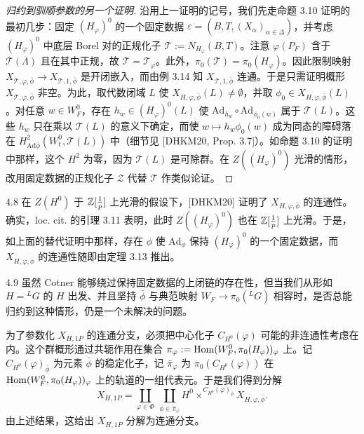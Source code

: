 \begin{proof}[归约到驯顺参数的另一个证明]
沿用上一证明的记号，我们先走命题 3.10 证明的最初几步：固定 $(H_\varphi)^0$ 的一个固定数据 $\varepsilon=(B,T,(X_\alpha)_{\alpha\in\Delta})$，并考虑 $(H_\varphi)^0$ 中底层 Borel 对的正规化子 $\mathcal T:=N_{H_\varphi}(B,T)$。注意 $\varphi(P_F)$ 含于 $\mathcal T(\Lambda)$ 且在其中正规，故 $\mathcal T=\mathcal T_\varphi$。此外，$\pi_0(\mathcal T)=\pi_0(H_\varphi)$。因此限制映射 $X_{\mathcal T,\varphi,\bar\phi}\to X_{\mathcal T,1,\bar\phi}$ 是开闭嵌入，而由例 3.14 知 $X_{\mathcal T,1,\bar\phi}$ 连通。于是只需证明概形 $X_{\mathcal T,\varphi,\bar\phi}$ 非空。为此，取代数闭域 $L$ 使 $X_{H,\varphi,\bar\phi}(L)\neq\emptyset$，并取 $\phi_0\in X_{H,\varphi,\bar\phi}(L)$。对任意 $w\in W^0_F$，存在 $h_w\in(H_\varphi)^0(L)$ 使 $\mathrm{Ad}_{h_w}\circ\mathrm{Ad}_{\phi_0(w)}$ 属于 $\mathcal T(L)$。这些 $h_w$ 只在乘以 $\mathcal T(L)$ 的意义下确定，而使 $w\mapsto h_w\phi_0(w)$ 成为同态的障碍落在 $H^2_{\mathrm{Ad}\bar\phi}(W^0_t,\mathcal T(L))$ 中（细节见 [DHKM20, Prop. 3.7]）。如命题 3.10 的证明中那样，这个 $H^2$ 为零，因为 $\mathcal T(L)$ 是可除群。在 $Z((H_\varphi)^0)$ 光滑的情形，改用固定数据的正规化子 $\mathcal Z$ 代替 $\mathcal T$ 作类似论证。
\end{proof}

\begin{rem}{4.8}
在 $Z(H^0)$ 于 $\mathbb{Z}[\frac1p]$ 上光滑的假设下，[DHKM20] 证明了 $X_{H,\varphi,\bar\phi}$ 的连通性。确实，loc. cit. 的引理 3.11 表明，此时 $Z((H_\varphi)^0)$ 也在 $\mathbb{Z}[\frac1p]$ 上光滑。于是，如上面的替代证明中那样，存在 $\phi$ 使 $\mathrm{Ad}_\phi$ 保持 $(H_\varphi)^0$ 的一个固定数据，而 $X_{H,\varphi,\bar\phi}$ 的连通性随即由定理 3.13 推出。
\end{rem}
\begin{rem}{4.9}
虽然 Cotner 能够绕过保持固定数据的上闭链的存在性，但当我们从形如 $H={}^LG$ 的 $H$ 出发、并且坚持 $\bar\phi$ 与典范映射 $W_F\to\pi_0({}^LG)$ 相容时，是否总能归约到这种情形，仍是一个未解决的问题。
\end{rem}

为了参数化 $X_{H,1P}$ 的连通分支，必须把中心化子 $C_{H^0}(\varphi)$ 可能的非连通性考虑在内。这个群概形通过共轭作用在集合 $\pi_\varphi:=\operatorname{Hom}(W^0_F,\pi_0(H_\varphi))_\varphi$ 上。记 $C_{H^0}(\varphi)_{\bar\phi}$ 为元素 $\bar\phi$ 的稳定化子，记 $\bar\pi_\varphi$ 为 $\pi_0(C_{H^0}(\varphi))$ 在 $\operatorname{Hom}(W^0_F,\pi_0(H_\varphi))_\varphi$ 上的轨道的一组代表元。于是我们得到分解
\begin{equation*}\tag*{(4.2)}
X_{H,1P}=\coprod_{\varphi\in\Phi}\ \coprod_{\bar\phi\in\bar\pi_\varphi}
H^0\times^{C_{H^0}(\varphi)_{\bar\phi}}X_{H,\varphi,\bar\phi}.
\end{equation*}
由上述结果，这给出 $X_{H,1P}$ 分解为连通分支。


